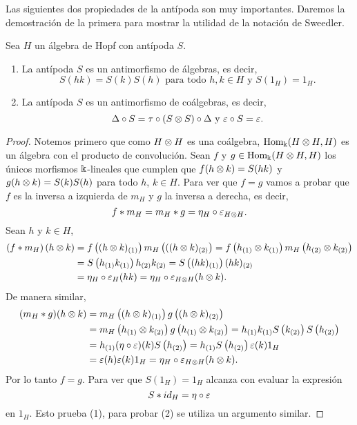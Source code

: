 \documentclass[a4paper,oneside,fleqn,11pt,../tesis.tex]{subfiles}
\begin{document}
Las siguientes dos propiedades de la antípoda son muy importantes. Daremos la demostración de la primera para mostrar la utilidad de
la notación de Sweedler.

\begin{prop} Sea $H$ un álgebra de Hopf con antípoda $S$.
	\begin{enumerate}[(1)]
		\item La antípoda $S$ es un antimorfismo de álgebras, es decir,
		\[
			S(hk) = S(k)S(h) \text{ para todo }	h,k \in H \text{ y } S(1_{H}) = 1_{H}.	
		\]
		\item La antípoda $S$ es un antimorfismo de coálgebras, es decir,
		\[
			\Delta \circ S = \tau \circ	(S \otimes S) \circ \Delta \text{ y } \varepsilon \circ S = \varepsilon.	
		\]
	\end{enumerate}
\end{prop}
\begin{proof}
	Notemos primero que como $H \otimes H$ es una coálgebra, $\operatorname{Hom}_{\Bbbk}(H \otimes H, H)$ es un álgebra con el producto de convolución.
	Sean $f$ y $g \in \operatorname{Hom}_{\Bbbk}(H \otimes H, H)$ los únicos morfismos $\Bbbk$-lineales que cumplen que
	$f(h \otimes k) = S(hk)$ y $g(h \otimes k) = S(k) S(h)$ para todo $h$, $k \in H$. Para ver que $f = g$ vamos a probar que $f$ es la inversa
	a izquierda de $m_{H}$ y $g$ la inversa a derecha, es decir,
	\[
		f \ast m_{H} = m_{H} \ast g = \eta_{H} \circ \varepsilon_{H \otimes H}.
	\]
	Sean $h$ y $k \in H$,
	\begin{align*}
		\left(f \ast m_H\right)\left(h \otimes k\right) &= f\left((h \otimes k)_{(1)}\right)m_H\left(((h \otimes k)_{(2)}\right)
			= f\left(h_{(1)} \otimes k_{(1)}\right) m_{H}\left(h_{(2)} \otimes k_{(2)}\right) \\
		&= S\left(h_{(1)} k_{(1)}\right)h_{(2)}k_{(2)} = S\left((hk)_{(1)}\right)(hk)_{(2)} \\
		&= \eta_H \circ \varepsilon_{H}(hk) = \eta_{H} \circ \varepsilon_{H\otimes H} (h \otimes k). 
	\end{align*}
	De manera similar,
	\begin{align*}
		(m_{H} \ast g)(h \otimes k) &= m_{H}\left((h \otimes k)_{(1)}\right)g\left((h \otimes k)_{(2)}\right) \\
		&= m_{H}\left(h_{(1)} \otimes k_{(2)}\right)g\left(h_{(1)} \otimes k_{(2)}\right)
			= h_{(1)}k_{(1)}S\left(k_{(2)}\right)S\left(h_{(2)}\right) \\
		&= h_{(1)} (\eta \circ \varepsilon) (k) S\left(h_{(2)}\right) = h_{(1)} S\left(h_{(2)}\right) \varepsilon(k) 1_{H} \\
		&= \varepsilon(h) \varepsilon(k) 1_{H} =\eta_{H} \circ \varepsilon_{H\otimes H} (h \otimes k).
	\end{align*}
	Por lo tanto $f = g$. Para ver que $S(1_{H}) = 1_{H}$ alcanza con evaluar la expresión
	\[
		S \ast id_{H} = \eta \circ \varepsilon
	\]
	en $1_{H}$. Esto prueba (1), para probar (2) se utiliza un argumento similar.
\end{proof}
\end{document}
